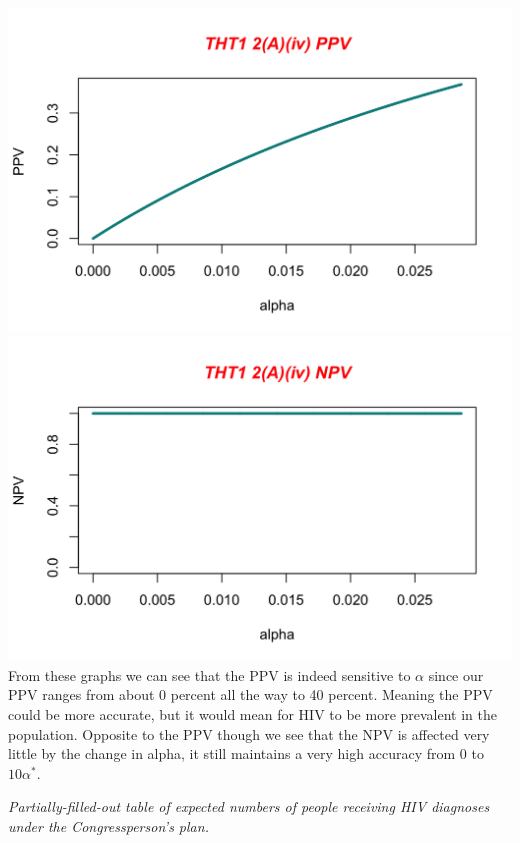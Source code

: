 \documentclass[12pt]{article}
\begin{document}
\begin{itemize}
\begin{itemize}
\begin{tcolorbox}[breakable]
    \includegraphics[scale = 0.18]{ppv} 
    \includegraphics[scale = 0.18]{NPV1} \\
    From these graphs we can see that the PPV is indeed sensitive to $\alpha$ since our PPV ranges from about 0 percent all the way to 40 percent. Meaning the PPV could be more accurate, but it would mean for HIV to be more prevalent in the population. Opposite to the PPV though we see that the NPV is affected very little by the change in alpha, it still maintains a very high accuracy from 0 to $10\alpha^{*}$.
 \end{tcolorbox}

\end{itemize}
\newpage

\begin{table}[t!]

\centering

\caption{\textit{Partially-filled-out table of expected numbers of people receiving HIV diagnoses under the Congressperson's plan.}}


\end{table}
\end{itemize}
\end{document}
